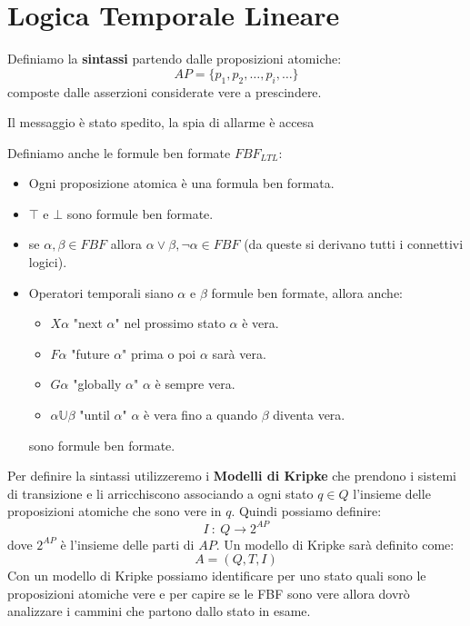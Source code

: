 \section{Logica Temporale Lineare}
Definiamo la \textbf{sintassi} partendo dalle proposizioni atomiche:
\begin{equation}
    AP=\{ p_1,p_2,\dots,p_i,\dots \}
\end{equation}
composte dalle asserzioni considerate vere a prescindere.
\begin{esempio}
    Il messaggio è stato spedito, la spia di allarme è accesa
\end{esempio}
Definiamo anche le formule ben formate $FBF_{LTL}$:
\begin{itemize}
    \item Ogni proposizione atomica è una formula ben formata.
    \item $\top$ e $\bot$ sono formule ben formate.
    \item se $\alpha,\beta\in FBF$ allora $\alpha\lor \beta,\lnot \alpha \in FBF$
          (da queste si derivano tutti i connettivi logici).
    \item Operatori temporali siano $\alpha$ e $\beta$ formule ben formate, allora
          anche:
          \begin{itemize}
              \item $X\alpha$ "next $\alpha$" nel prossimo stato $\alpha$ è vera.
              \item $F\alpha$ "future $\alpha$" prima o poi $\alpha$ sarà vera.
              \item $G\alpha$ "globally $\alpha$" $\alpha$ è sempre vera.
              \item $\alpha\mathbb{U}\beta$ "until $\alpha$" $\alpha$ è vera fino
                    a quando $\beta$ diventa vera.
          \end{itemize}
          sono formule ben formate.
\end{itemize}
Per definire la sintassi utilizzeremo i \textbf{Modelli di Kripke} che prendono
i sistemi di transizione e li arricchiscono associando a ogni stato $q \in Q$
l'insieme delle proposizioni atomiche che sono vere in $q$. Quindi possiamo
definire:
\begin{equation}
    I \ : \ Q \rightarrow 2 ^{AP}
\end{equation}
dove $2^{AP}$ è l'insieme delle parti di $AP$. Un modello di Kripke sarà definito
come:
\begin{equation}
    A=(Q,T,I)
\end{equation}
Con un modello di Kripke possiamo identificare per uno stato quali sono le
proposizioni atomiche vere e per capire se le FBF sono vere allora dovrò analizzare
i cammini che partono dallo stato in esame.

